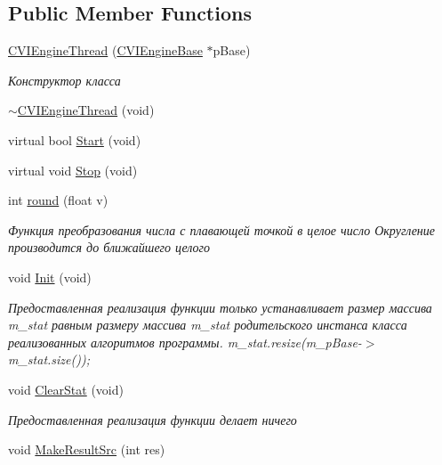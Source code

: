 \subsection*{Public Member Functions}
\begin{DoxyCompactItemize}
\item 
\hyperlink{class_c_v_i_engine_thread_ae988fa69cb7743794ab221309f581d62}{C\+V\+I\+Engine\+Thread} (\hyperlink{class_c_v_i_engine_base}{C\+V\+I\+Engine\+Base} $\ast$p\+Base)
\begin{DoxyCompactList}\small\item\em Конструктор класса \end{DoxyCompactList}\item 
\hyperlink{class_c_v_i_engine_thread_a62a261241845149502fceb9a98f75ce0}{$\sim$\+C\+V\+I\+Engine\+Thread} (void)
\item 
virtual bool \hyperlink{class_c_v_i_engine_thread_a6ce21dad9996e7dba3b23882d010db17}{Start} (void)
\item 
virtual void \hyperlink{class_c_v_i_engine_thread_a5a8d55cd216084f924cd75b8ede97fc8}{Stop} (void)
\item 
int \hyperlink{class_c_v_i_engine_thread_ab377abdaf5512ce301f5a5f817a4ec7f}{round} (float v)
\begin{DoxyCompactList}\small\item\em Функция преобразования числа с плавающей точкой в целое число Округление производится до ближайшего целого \end{DoxyCompactList}\item 
void \hyperlink{class_c_v_i_engine_thread_a8bd3c1702025f3db9b6e29c2dcb2b264}{Init} (void)
\begin{DoxyCompactList}\small\item\em Предоставленная реализация функции только устанавливает размер массива m\+\_\+stat равным размеру массива m\+\_\+stat родительского инстанса класса реализованных алгоритмов программы. m\+\_\+stat.\+resize(m\+\_\+p\+Base-\/$>$m\+\_\+stat.\+size()); \end{DoxyCompactList}\item 
void \hyperlink{class_c_v_i_engine_thread_a608a3c62caea2e713736b5b8efd2f6ea}{Clear\+Stat} (void)
\begin{DoxyCompactList}\small\item\em Предоставленная реализация функции делает ничего \end{DoxyCompactList}\item 
void \hyperlink{class_c_v_i_engine_thread_a36b1ea71981bd36fa9545fa68e98e78b}{Make\+Result\+Src} (int res)

\end{DoxyCompactItemize}
